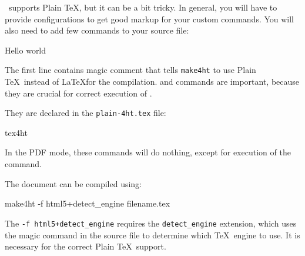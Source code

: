 \texfourht\ supports Plain \TeX, but it can be a bit tricky. In general, you
will have to provide configurations to get good markup for your custom
commands. You will also need to add few commands to your source file: 

\begin{texsource}

\document
Hello world
\enddocument
\end{texsource}

The first line contains magic comment that tells \texttt{make4ht} to use Plain
\TeX\ instead of \LaTeX for the compilation. \texcommand{\document} and \texcommand{\enddocument}
commands are important, because they are crucial for correct execution of \texfourht.

They are declared in the \texttt{plain-4ht.tex} file:

\begin{texsource}
\def\documentstyle#1{}
\documentstyle{tex4ht}
\csname tex4ht\endcsname
\def\document{}
\def\enddocument{\csname bye\endcsname}
\end{texsource}

In the PDF mode, these commands will do nothing, except for execution of the \texcommand{\bye} command.

The document can be compiled using:

\begin{shellcommand}
make4ht -f html5+detect_engine filename.tex
\end{shellcommand}

The \verb|-f html5+detect_engine| requires the \verb|detect_engine| extension,
which uses the magic command in the source file to determine which \TeX\ engine
to use. It is necessary for the correct Plain \TeX\ support.
